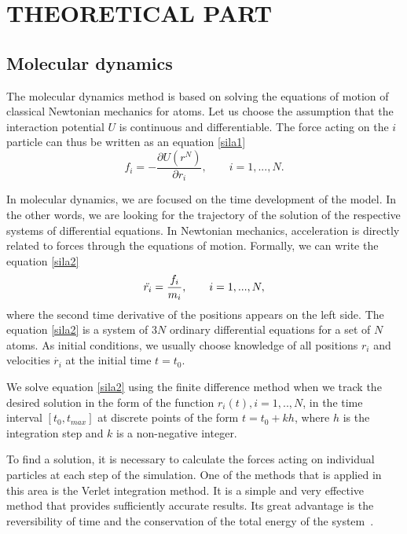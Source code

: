 \newpage
\section{THEORETICAL PART}

\subsection{Molecular dynamics}
The molecular dynamics method is based on solving the equations of motion of classical Newtonian mechanics for atoms. Let us choose the assumption that the interaction potential $U$ is continuous and differentiable. The force acting on the $i$ particle can thus be written as an equation \ref{sila1} 
\begin{equation}\label{sila1}
	f_i=-\frac{\partial U(r^N)}{\partial r_i}, \qquad i=1,...,N.
\end{equation}

In molecular dynamics, we are focused on the time development of the model. In the other words, we are looking for the trajectory of the solution of the respective systems of differential equations. In Newtonian mechanics, acceleration is directly related to forces through the equations of motion. Formally, we can write the equation \ref{sila2}
\begin{equation}\label{sila2}
	\Ddot{r_i}=\frac{f_i}{m_i}, \qquad i=1,...,N,
\end{equation}
where the second time derivative of the positions appears on the left side. The equation \ref{sila2} is a system of 3$N$ ordinary differential equations for a set of $N$ atoms. As initial conditions, we usually choose knowledge of all positions $r_i$ and velocities $\dot{r_i}$ at the initial time $t=t_0$. 

We solve equation \ref{sila2} using the finite difference method when we track the desired solution in the form of the function $r_i(t), i=1,..,N$, in the time interval $[t_0,t_{max}]$ at discrete points of the form $t=t_0+kh$, where $h$ is the integration step and $k$ is a non-negative integer.

To find a solution, it is necessary to calculate the forces acting on individual particles at each step of the simulation. One of the methods that is applied in this area is the Verlet integration method. It is a simple and very effective method that provides sufficiently accurate results. Its great advantage is the reversibility of time and the conservation of the total energy of the system~\cite{mdskripta}.

